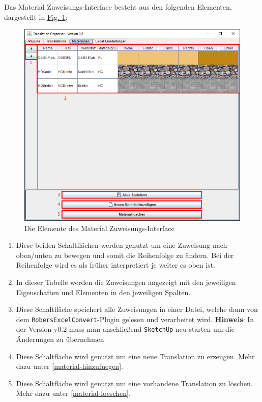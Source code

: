 \documentclass{book}
\newcommand{\sketchup}{\texttt{SketchUp}\xspace}
\newcommand{\robersexcelconvert}{\texttt{RobersExcelConvert}\xspace}
\newcommand{\hinweis}[1]{\newline \textbf{Hinweis}: #1 \newline}
\begin{document}
			Das Material Zuweisungs-Interface besteht aus den folgenden Elementen, dargestellt in \hyperref[fig:materials-normal]{Fig. \ref{fig:materials-normal}}:
			\begin{figure}
				\centering
				\includegraphics[scale=0.48]{pics/assisttool/materials-normal.png}
				\caption{Die Elemente des Material Zuweisungs-Interface}
				\label{fig:materials-normal}
			\end{figure}
			
			\begin{enumerate}
				\item Diese beiden Schaltflächen werden genutzt um eine Zuweisung nach oben/unten zu bewegen und somit die Reihenfolge zu ändern. Bei der Reihenfolge wird es als früher interpretiert je weiter es oben ist.
				\item In dieser Tabelle werden die Zuweisungen angezeigt mit den jeweiligen Eigenschaften und Elementen in den jeweiligen Spalten.
				\item Diese Schaltfläche speichert alle Zuweisungen in einer Datei, welche dann von dem \robersexcelconvert-Plugin gelesen und verarbeitet wird.
				\hinweis{In der Version v0.2 muss man anschließend \sketchup neu starten um die Änderungen zu übernehmen}
				\item Diese Schaltfläche wird genutzt um eine neue Translation zu erzeugen. Mehr dazu unter \hyperref[material-hinzufuegen]{\ref{material-hinzufuegen}}.
				\item Diese Schaltfläche wird genutzt um eine vorhandene Translation zu löschen. Mehr dazu unter \hyperref[material-loeschen]{\ref{material-loeschen}}.
			\end{enumerate}
		
\end{document}
